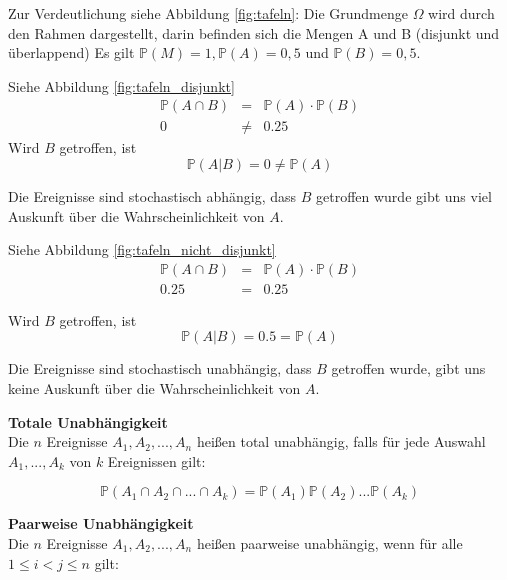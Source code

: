 {    Zur Verdeutlichung siehe Abbildung \ref{fig:tafeln}:
    Die Grundmenge $\Omega$ wird durch den Rahmen dargestellt, darin
    befinden sich die Mengen A und B (disjunkt und überlappend) Es gilt
    $\mathbb P\left(M\right)=1,\mathbb P\left(A\right)=0,5$
    und
    $\mathbb P\left(B\right)=0,5$.

    \begin{multicols}{2}
        Siehe Abbildung \ref{fig:tafeln_disjunkt}\\
        \begin{eqnarray*}
            \mathbb{P}(A\cap B) &=& \mathbb{P}(A)\cdot \mathbb{P}(B)\\
            0 &\neq& 0.25
        \end{eqnarray*}
    Wird $B$ getroffen, ist
    \[\mathbb{P}\left(A|B\right)=0\neq \mathbb P(A)\]
    
    Die Ereignisse sind stochastisch abhängig, dass $B$ getroffen wurde gibt
    uns viel Auskunft über die Wahrscheinlichkeit von $A$.
    
    \columnbreak
        Siehe Abbildung \ref{fig:tafeln_nicht_disjunkt}\\
        \begin{eqnarray*}
            \mathbb{P}(A\cap B) &=& \mathbb{P}(A)\cdot \mathbb{P}(B)\\
            0.25 &=& 0.25
        \end{eqnarray*}

    Wird $B$ getroffen, ist
    \[\mathbb P\left(A|B\right)=0.5=\mathbb P(A)\]

    Die Ereignisse sind stochastisch unabhängig, dass $B$ getroffen wurde,
    gibt uns keine Auskunft über die Wahrscheinlichkeit von $A$.
    \end{multicols}

    \begin{definition}\textbf{Totale Unabhängigkeit}\\
        Die $n$ Ereignisse $A_{1},A_{2},...,A_{n}$ heißen total unabhängig, falls für jede Auswahl $A_{1},...,A_{k}$ 
        von $k$ Ereignissen gilt:

        \[
            \mathbb P\left(A_{1}\cap A_{2}\cap ... \cap A_{k}\right)=
            \mathbb P\left(A_{1}\right)\mathbb P\left(A_{2}\right)... \mathbb P(A_{k})
        \]

    \end{definition}

    \begin{definition}\textbf{Paarweise Unabhängigkeit}\\
        Die $n$ Ereignisse $A_{1},A_{2},...,A_{n}$ heißen paarweise unabhängig, wenn für alle $1\leq i<j\leq n$ gilt:


\end{definition}}
